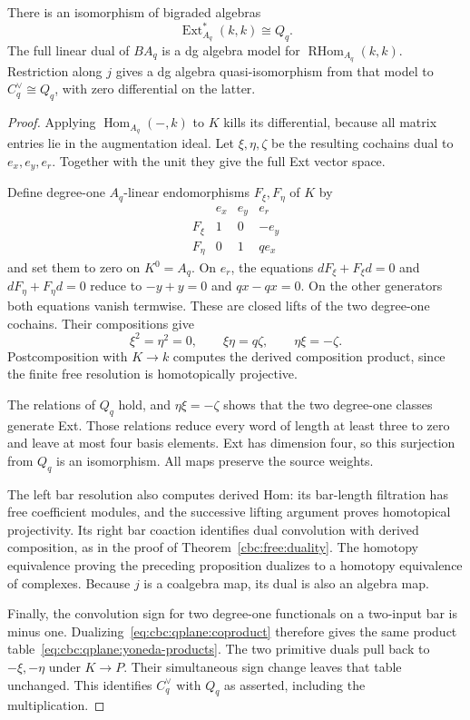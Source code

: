 \begin{theorem}\label{cbc:qplane:yoneda}
There is an isomorphism of bigraded algebras
\[
 \operatorname{Ext}_{A_q}^*(k,k)\cong Q_q.
\]
The full linear dual of $BA_q$ is a dg algebra model for $\operatorname{RHom}_{A_q}(k,k)$.
Restriction along $j$ gives a dg algebra quasi-isomorphism from that model to $C_q^\vee\cong Q_q$, with zero differential on the latter.
\end{theorem}
\begin{proof}
Applying $\operatorname{Hom}_{A_q}(-,k)$ to $K$ kills its differential, because all matrix entries lie in the augmentation ideal.
Let $\xi,\eta,\zeta$ be the resulting cochains dual to $e_x,e_y,e_r$.
Together with the unit they give the full Ext vector space.

Define degree-one $A_q$-linear endomorphisms $F_\xi,F_\eta$ of $K$ by
\[
 \begin{array}{c|ccc}
       &e_x&e_y&e_r\\ \hline
 F_\xi&1&0&-e_y\\
 F_\eta&0&1&q e_x
 \end{array}
\]
and set them to zero on $K^0=A_q$.
On $e_r$, the equations $dF_\xi+F_\xi d=0$ and $dF_\eta+F_\eta d=0$ reduce to $-y+y=0$ and $qx-qx=0$.
On the other generators both equations vanish termwise.
These are closed lifts of the two degree-one cochains.
Their compositions give
\begin{equation}\label{eq:cbc:qplane:yoneda-products}
 \xi^2=\eta^2=0,\qquad
 \xi\eta=q\zeta,\qquad \eta\xi=-\zeta.
\end{equation}
Postcomposition with $K\to k$ computes the derived composition product, since the finite free resolution is homotopically projective.

The relations of $Q_q$ hold, and $\eta\xi=-\zeta$ shows that the two degree-one classes generate Ext.
Those relations reduce every word of length at least three to zero and leave at most four basis elements.
Ext has dimension four, so this surjection from $Q_q$ is an isomorphism.
All maps preserve the source weights.

The left bar resolution also computes derived Hom: its bar-length filtration has free coefficient modules, and the successive lifting argument proves homotopical projectivity.
Its right bar coaction identifies dual convolution with derived composition, as in the proof of Theorem~\ref{cbc:free:duality}.
The homotopy equivalence proving the preceding proposition dualizes to a homotopy equivalence of complexes.
Because $j$ is a coalgebra map, its dual is also an algebra map.

Finally, the convolution sign for two degree-one functionals on a two-input bar is minus one.
Dualizing~\eqref{eq:cbc:qplane:coproduct} therefore gives the same product table~\eqref{eq:cbc:qplane:yoneda-products}.
The two primitive duals pull back to $-\xi,-\eta$ under $K\to P$.
Their simultaneous sign change leaves that table unchanged.
This identifies $C_q^\vee$ with $Q_q$ as asserted, including the multiplication.
\end{proof}

